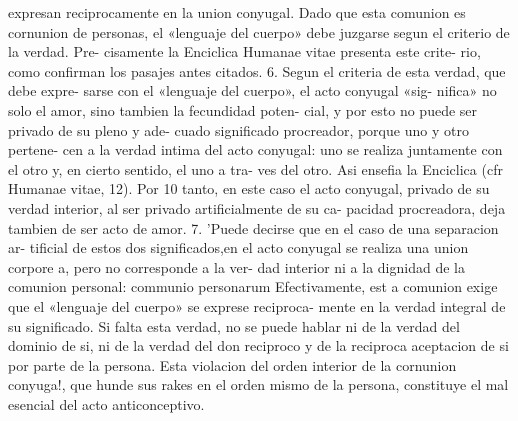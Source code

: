 \documentclass[letterpaper]{report}
\begin{document}
expresan reciprocamente en la union conyugal. Dado que 
esta comunion es cornunion de personas, el «lenguaje del 
cuerpo» debe juzgarse segun el criterio de la verdad. Pre- 
cisamente la Enciclica Humanae vitae presenta este crite- 
rio, como confirman los pasajes antes citados. 
6. Segun el criteria de esta verdad, que debe expre- 
sarse con el «lenguaje del cuerpo», el acto conyugal «sig- 
nifica» no solo el amor, sino tambien la fecundidad poten- 
cial, y por esto no puede ser privado de su pleno y ade- 
cuado significado procreador, porque uno y otro pertene- 
cen a la verdad intima del acto conyugal: uno se realiza 
juntamente con el otro y, en cierto sentido, el uno a tra- 
ves del otro. Asi ensefia la Enciclica (cfr Humanae vitae, 
12). Por 10 tanto, en este caso el acto conyugal, privado de 
su verdad interior, al ser privado artificialmente de su ca- 
pacidad procreadora, deja tambien de ser acto de amor. 
7. 'Puede decirse que en el caso de una separacion ar- 
tificial de estos dos significados,en el acto conyugal se 
realiza una union corpore a, pero no corresponde a la ver- 
dad interior ni a la dignidad de la comunion personal: 
communio personarum Efectivamente, est a comunion 
exige que el «lenguaje del cuerpo» se exprese reciproca- 
mente en la verdad integral de su significado. Si falta esta 
verdad, no se puede hablar ni de la verdad del dominio 
de si, ni de la verdad del don reciproco y de la reciproca 
aceptacion de si por parte de la persona. Esta violacion 
del orden interior de la cornunion conyuga!, que hunde 
sus rakes en el orden mismo de la persona, constituye el 
mal esencial del acto anticonceptivo.
	
\end{document}
